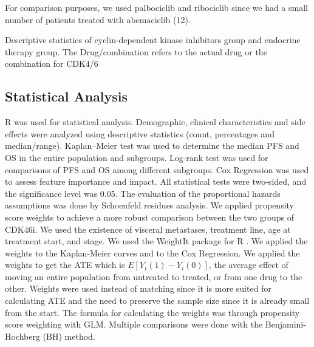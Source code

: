 For comparison purposes, we used palbociclib and ribociclib since we had a small number of patients treated with abemaciclib (12).

 
\begin{table}
\caption{Descriptive statistics of cyclin-dependent kinase inhibitors group and endocrine therapy group. The Drug/combination refers to the actual drug or the combination for CDK4/6}
\centering
\label{tab:stats_ipop_cdk}

\end{table}




\subsection{Statistical Analysis}
R was used for statistical analysis. Demographic, clinical characteristics and side effects were analyzed using descriptive statistics (count, percentages and median/range). Kaplan–Meier test was used to determine the median PFS and OS in the entire population and subgroups. Log-rank test was used for comparisons of PFS and OS among different subgroups. Cox Regression was used to assess feature importance and impact. All statistical tests were two-sided, and the significance level was 0.05. The evaluation of the proportional hazards assumptions was done by Schoenfeld residues analysis.
We applied propensity score weights to achieve a more robust comparison between the two groups of CDK4\/6i. We used the existence of visceral metastases, treatment line, age at treatment start, and stage. We used the WeightIt package for R \cite{WeightIt}. We applied the weights to the Kaplan-Meier curves and to the Cox Regression. We applied the weights to get the ATE which is $E[Y_i(1)-Y_i(0)]$, the average effect of moving an entire population from untreated to treated, or from one drug to the other. Weights were used instead of matching since it is more suited for calculating ATE and the need to preserve the sample size since it is already small from the start. The formula for calculating the weights was through propensity score weighting with GLM. Multiple comparisons were done with the Benjamini-Hochberg (BH) method. 




